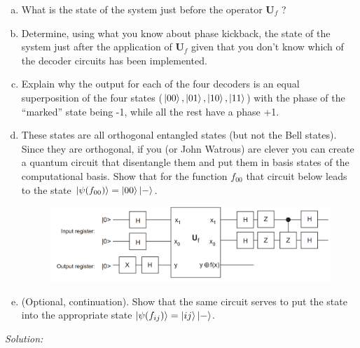 \documentclass{book}
\theoremstyle{definition}
\newcommand{\U}{\mathbf{U}}
\begin{document}
\begin{enumerate}[(a)]
	\item What is the state of the system just before the operator $\U_f$ ?
	\item Determine, using what you know about phase kickback, the state of the system just after
	the application of $\U_f$ given that you don't know which of the decoder circuits has been
	implemented.
	\item Explain why the output for each of the four decoders is an equal superposition of the
	four states ($\ket{00},\ket{01}, \ket{10}, \ket{11}$) with the phase of the ``marked'' state being -1, while all the rest have a phase +1.
	\item These states are all orthogonal entangled states (but not the Bell states). Since they are
	orthogonal, if you (or John Watrous) are clever you can create a quantum circuit that
	disentangle them and put them in basis states of the computational basis. Show that
	for the function $f_{00}$ that circuit below leads to the state $ \ket{\psi(f_{00})} = \ket{00}\ket{-}$.
	\begin{figure}[!htb]
		\centering
		\includegraphics[scale=0.3]{phase3}
	\end{figure}

	\item  (Optional, continuation). Show that the same circuit serves to put the state into the
	appropriate state $\ket{\psi(f_{ij})} = \ket{ij}\ket{-}$.
\end{enumerate}



\noindent \textit{Solution:}
\end{document}
